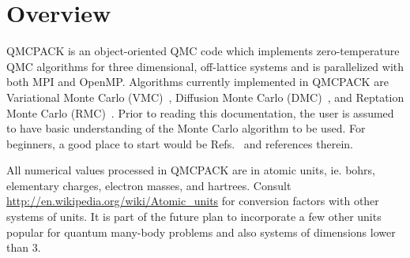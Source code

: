 \chapter{Overview}
QMCPACK is an object-oriented QMC code which implements zero-temperature QMC algorithms for three dimensional, off-lattice systems and is parallelized with both MPI and OpenMP.  Algorithms currently implemented in QMCPACK are Variational Monte Carlo (VMC)~\cite{PhysRev.138.A442,PhysRevB.16.3081}, Diffusion Monte Carlo (DMC)~\cite{Ceperley1979,Schmidt1984}, and Reptation Monte Carlo (RMC)~\cite{PhysRevLett.82.4745}.  Prior to reading this documentation, the user is assumed to have basic understanding of the Monte Carlo algorithm to be used.  For beginners, a good place to start would be Refs.~\cite{Nightingale1998,Thijssen2007} and references therein.
 
All numerical values processed in QMCPACK are in atomic units, ie. bohrs, elementary charges, electron masses, and hartrees.  Consult \url{http://en.wikipedia.org/wiki/Atomic_units} for conversion factors with other systems of units.  It is part of the future plan to incorporate a few other units popular for quantum many-body problems and also systems of dimensions lower than 3.

